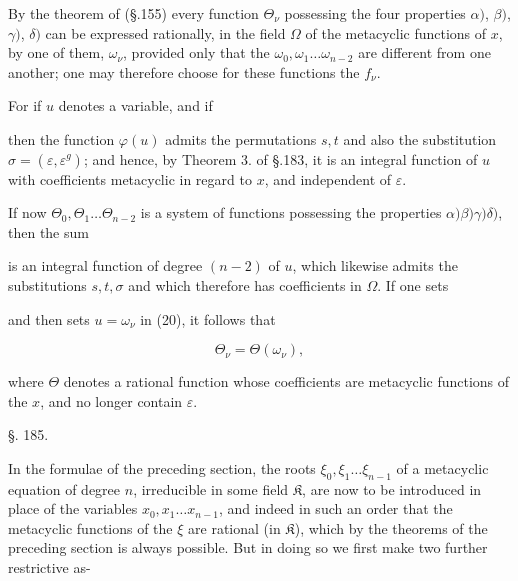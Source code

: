 By the theorem of  (§.155) every function
$\Theta_\nu$ possessing the four properties $\alpha)$, $\beta)$,
$\gamma)$, $\delta)$ can be expressed rationally, in the field $\Omega$
of the metacyclic functions of $x$, by one of them, $\omega_\nu$,
provided only that the $\omega_0, \omega_1 \ldots \omega_{n-2}$ are
different from one another; one may therefore choose for these functions
the $f_\nu$.

For if $u$ denotes a variable, and if


then the function $\varphi(u)$ admits the permutations $s, t$ and also
the substitution $\sigma = (\varepsilon, \varepsilon^g)$; and hence, by
Theorem 3. of §.183, it is an integral function of $u$ with coefficients
metacyclic in regard to $x$, and independent of $\varepsilon$.

If now $\Theta_0, \Theta_1 \ldots \Theta_{n-2}$ is a system of
functions possessing the properties $\alpha) \beta) \gamma) \delta)$,
then the sum


is an integral function of degree $(n-2)$ of $u$, which likewise admits
the substitutions $s, t, \sigma$ and which therefore has coefficients in
$\Omega$. If one sets


and then sets $u = \omega_\nu$ in (20), it follows that

\[
\Theta_\nu = \Theta(\omega_\nu),
\]

where $\Theta$ denotes a rational function whose coefficients are
metacyclic functions of the $x$, and no longer contain $\varepsilon$.

\begin{center}
§. 185.

\end{center}

In the formulae of the preceding section, the roots $\xi_0, \xi_1
\ldots \xi_{n-1}$ of a metacyclic equation of degree $n$, irreducible
in some field $\mathfrak{K}$, are now to be introduced in place of the
variables $x_0, x_1 \ldots x_{n-1}$, and indeed in such an order that
the metacyclic functions of the $\xi$ are rational (in $\mathfrak{K}$),
which by the theorems of the preceding section is always possible. But
in doing so we first make two further restrictive as-
